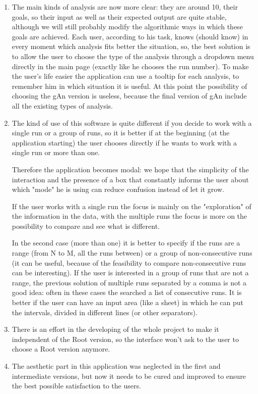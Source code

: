 \begin{enumerate}

\item
The main kinds of analysis are now more clear: they are around 10, their goals, so their input as well as their expected output are quite stable, although we will still probably modify the algorithmic ways in which these goals are achieved. Each user, according to his task, knows (should know) in every moment which analysis fits better the situation, so, the best solution is to allow the user to choose the type of the analysis through a dropdown menu directly in the main page (exactly like he chooses the run number). To make the user's life easier the application can use a tooltip for each analysis, to remember him in which situation it is useful. At this point the possibility of choosing the gAn version is useless, because the final version of gAn include all the existing types of analysis. 

\item 
The kind of use of this software is quite different if you decide to work with a single run or a group of runs, so it is better if at the beginning (at the application starting) the user chooses directly if he wants to work with a single run or more than one. 

Therefore the application becomes modal: we hope that the simplicity of the interaction and the presence of a box that constantly informs the user about which "mode" he is using can reduce confusion instead of let it grow.  

If the user works with a single run the focus is mainly on the "exploration" of the information in the data, with the multiple runs the focus is more on the possibility to compare and see what is different.

In the second case (more than one) it is better to specify if the runs are a range (from N to M, all the runs between) or a group of non-consecutive runs (it can be useful, because of the feasibility to compare non-consecutive runs can be interesting). If the user is interested in a group of runs that are not a range, the previous solution of multiple runs separated by a comma is not a good idea: often in these cases the searched a list of consecutive runs. It is better if the user can have an input area (like a sheet) in which he can put the intervals, divided in different lines (or other separators).

\item
There is an effort in the developing of the whole project to make it independent of the Root version, so the interface won't ask to the user to choose a Root version anymore. 

\item
The aesthetic part in this application was neglected in the first and intermediate versions, but now it needs to be cured and improved to ensure the best possible satisfaction to the users. 

\end{enumerate}

